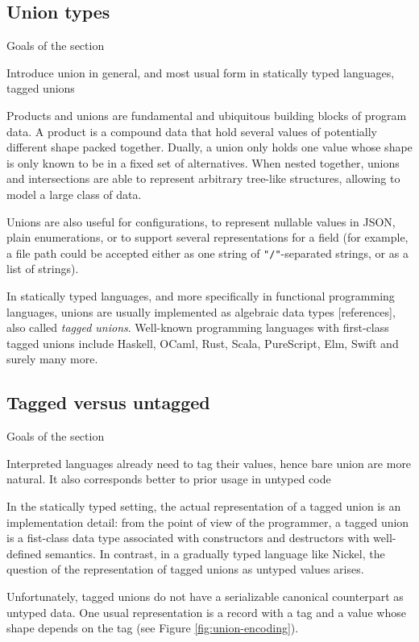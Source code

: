 \documentclass{article}
\begin{document}
\subsection{Union types}
\color{red}Goals of the section

Introduce union in general, and most usual form in statically typed languages, tagged unions\vspace{0.5cm}\color{black}

Products and unions are fundamental and ubiquitous building blocks of program
data. A product is a compound data that hold several values of potentially
different shape packed together. Dually, a union only holds one value whose
shape is only known to be in a fixed set of alternatives. When nested together,
unions and intersections are able to represent arbitrary tree-like structures,
allowing to model a large class of data.

Unions are also useful for configurations, to represent nullable values in JSON,
plain enumerations, or to support several representations for a field (for
example, a file path could be accepted either as one string of
\lstinline+"/"+-separated strings, or as a list of strings).

In statically typed languages, and more specifically in functional programming
languages, unions are usually implemented as algebraic data types [references],
also called \emph{tagged unions}. Well-known programming languages with
first-class tagged unions include Haskell, OCaml, Rust, Scala, PureScript, Elm,
Swift and surely many more.

\subsection{Tagged versus untagged}
\color{red}Goals of the section

Interpreted languages already need to tag their values, hence bare union are more natural.
It also corresponds better to prior usage in untyped code\vspace{0.5cm}\color{black}

In the statically typed setting, the actual representation of a tagged union is
an implementation detail: from the point of view of the programmer, a tagged
union is a fist-class data type associated with constructors and destructors
with well-defined semantics. In contrast, in a gradually typed language like
Nickel, the question of the representation of tagged unions as untyped values
arises.

Unfortunately, tagged unions do not have a serializable canonical counterpart as
untyped data. One usual representation is a record with a tag and a value whose
shape depends on the tag (see Figure \ref{fig:union-encoding}).
\end{document}
